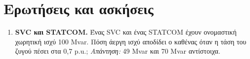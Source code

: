 
\section{Ερωτήσεις και ασκήσεις}

\begin{enumerate}
\item \textbf{SVC και STATCOM.} Ένας SVC και ένας STATCOM έχουν ονομαστική χωρητική ισχύ
      100 Mvar. Πόση άεργη ισχύ αποδίδει ο καθένας όταν η τάση του ζυγού πέσει στα 0,7 p.u.;
      \emph{Απάντηση:} 49 Mvar και 70 Mvar αντίστοιχα.
\end{enumerate}


